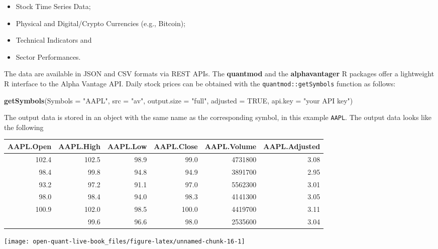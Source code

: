 \documentclass[]{book}
\newenvironment{Shaded}{\begin{snugshade}}{\end{snugshade}}
\newcommand{\KeywordTok}[1]{\textcolor[rgb]{0.13,0.29,0.53}{\textbf{#1}}}
\newcommand{\DataTypeTok}[1]{\textcolor[rgb]{0.13,0.29,0.53}{#1}}
\newcommand{\StringTok}[1]{\textcolor[rgb]{0.31,0.60,0.02}{#1}}
\newcommand{\OtherTok}[1]{\textcolor[rgb]{0.56,0.35,0.01}{#1}}
\newcommand{\NormalTok}[1]{#1}
\providecommand{\tightlist}{%
  \setlength{\itemsep}{0pt}\setlength{\parskip}{0pt}}
\theoremstyle{definition}
\theoremstyle{definition}
\theoremstyle{definition}
\theoremstyle{remark}
\begin{document}
\begin{itemize}
\tightlist
\item
  Stock Time Series Data;
\item
  Physical and Digital/Crypto Currencies (e.g., Bitcoin);
\item
  Technical Indicators and
\item
  Sector Performances.
\end{itemize}

The data are available in JSON and CSV formats via REST APIs. The
\textbf{quantmod} and the \textbf{alphavantager} R packages offer a
lightweight R interface to the Alpha Vantage API. Daily stock prices can
be obtained with the \texttt{quantmod::getSymbols} function as follows:

\begin{Shaded}
\begin{Highlighting}[]
\KeywordTok{getSymbols}\NormalTok{(}\DataTypeTok{Symbols =} \StringTok{"AAPL"}\NormalTok{, }\DataTypeTok{src =} \StringTok{"av"}\NormalTok{, }\DataTypeTok{output.size =} \StringTok{"full"}\NormalTok{, }
  \DataTypeTok{adjusted =} \OtherTok{TRUE}\NormalTok{, }\DataTypeTok{api.key =} \StringTok{"your API key"}\NormalTok{)}
\end{Highlighting}
\end{Shaded}

The output data is stored in an object with the same name as the
corresponding symbol, in this example \texttt{AAPL}. The output data
looks like the following

\begin{tabular}{rrrrrr}
\toprule
AAPL.Open & AAPL.High & AAPL.Low & AAPL.Close & AAPL.Volume & AAPL.Adjusted\\
\midrule
102.4 & 102.5 & 98.9 & 99.0 & 4731800 & 3.08\\
98.4 & 99.8 & 94.8 & 94.9 & 3891700 & 2.95\\
93.2 & 97.2 & 91.1 & 97.0 & 5562300 & 3.01\\
98.0 & 98.4 & 94.0 & 98.3 & 4141300 & 3.05\\
100.9 & 102.0 & 98.5 & 100.0 & 4419700 & 3.11\\
\addlinespace
99.6 & 99.6 & 96.6 & 98.0 & 2535600 & 3.04\\
\bottomrule
\end{tabular}

\begin{center}\texttt{[image: open-quant-live-book\_files/figure-latex/unnamed-chunk-16-1]} \end{center}
\end{document}
